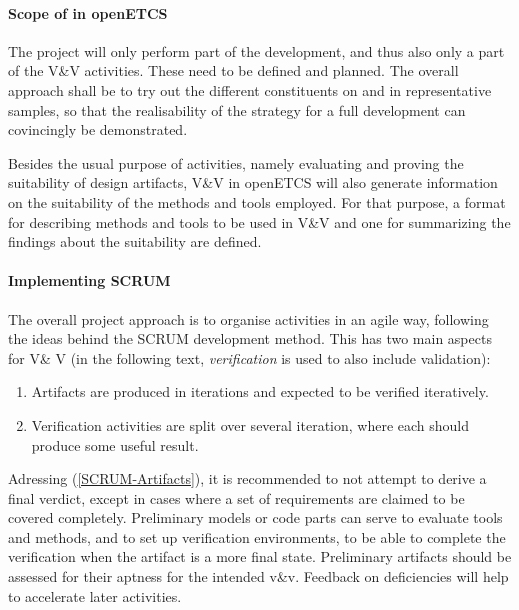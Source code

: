 

\paragraph{Scope of \VV in openETCS}

The project will only perform part of the development, and thus also
only a part of the V\&V activities. These need to be defined and
planned. The overall approach shall be to try out the different
constituents on and in representative samples, so that the
realisability of the \vv strategy for a full development can
covincingly be demonstrated.

Besides the usual purpose of \vv activities, namely evaluating and
proving the suitability of design artifacts, V\&V in openETCS will
also generate information on the suitability of the methods and tools
employed. For that purpose, a format for describing methods and tools
to be used in V\&V and one for summarizing the findings about the
suitability are defined.

\paragraph{Implementing SCRUM}
The overall project approach is to organise activities in an agile
way, following the ideas behind the SCRUM development
method. This has two main aspects for V\& V (in the following text,
\emph{verification} is used to also include validation):

\begin{enumerate}
\item \label{SCRUM-Artifacts} Artifacts are produced in iterations and
  expected to be verified iteratively.
\item \label{SCRUM-Split} Verification activities are split over
several iteration, where each should produce some useful result.
\end{enumerate}

Adressing (\ref{SCRUM-Artifacts}), it is recommended to not attempt to
derive a final verdict, except in cases where a set of requirements
are claimed to be covered completely. Preliminary models or code parts
can serve to evaluate tools and methods, and to set up verification
environments, to be able to complete the verification when the
artifact is a more final state. Preliminary artifacts should be
assessed for their aptness for the intended v\&v. Feedback on
deficiencies will help to accelerate later activities.

